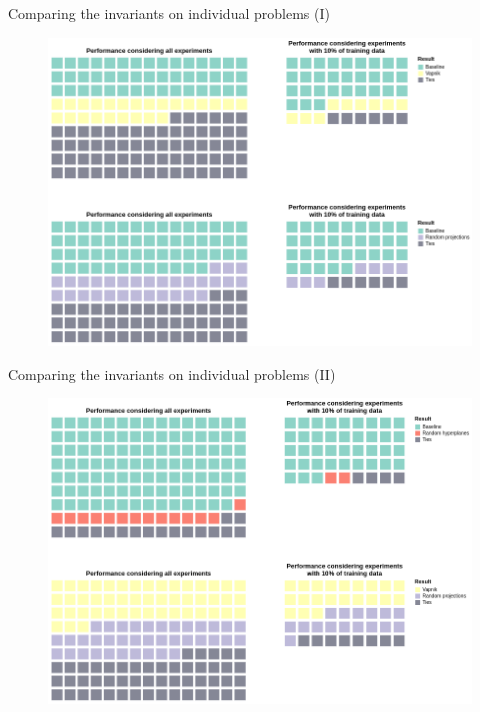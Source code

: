 \documentclass[10pt, dvipsnames]{beamer}
\begin{document}
\begin{frame}{Comparing the invariants on individual problems (I)}
    \begin{figure}
        \centering
        \includegraphics[width=\textwidth]{presentation/figures/invariants_performance_1.png}
    \end{figure}
\end{frame}

\begin{frame}{Comparing the invariants on individual problems (II)}
    \begin{figure}
        \centering
        \includegraphics[width=\textwidth]{presentation/figures/invariants_performance_2.png}
    \end{figure}
\end{frame}
\end{document}
